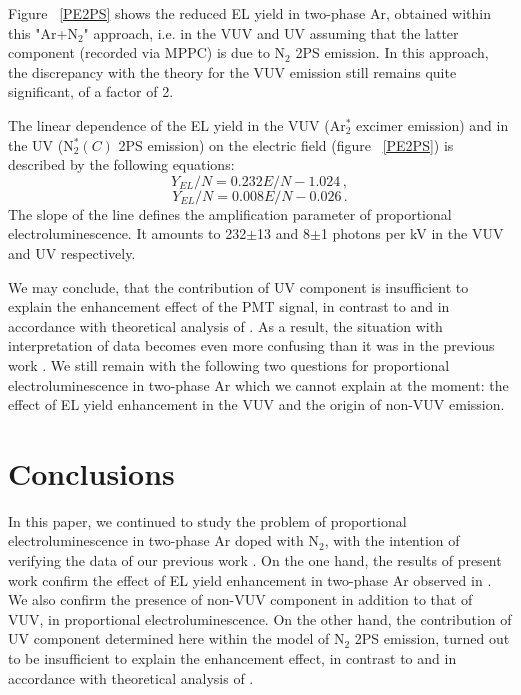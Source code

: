 \documentclass[a4paper,11pt]{article}
\begin{document}
Figure ~\ref{PE2PS} shows the reduced EL yield in two-phase Ar, obtained within this "Ar+N$_2$" approach, i.e. in the VUV and UV assuming that the latter component (recorded via MPPC) is due to N$_2$ 2PS emission. In this approach, the discrepancy with the theory for the VUV emission still remains quite significant, of a factor of 2.

The linear dependence of the EL yield in the VUV (Ar$^{\ast}_2$ excimer emission) and in the UV (N$_2^{\ast}(C)$ 2PS emission) on the electric field (figure ~\ref{PE2PS}) is described by the following equations:
\begin{equation}
Y_{EL}/N = 0.232E/N-1.024 \,,
\end{equation}
\begin{equation}
Y_{EL}/N = 0.008E/N-0.026 \,.
\end{equation}
The slope of the line defines the amplification parameter of proportional electroluminescence. It amounts to 232$\pm$13 and 8$\pm$1 photons per kV in the VUV and UV respectively.

We may conclude, that the contribution of UV component is insufficient to explain the enhancement effect of the PMT signal, in contrast to \cite{CRADPropEL15} and in accordance with theoretical analysis of \cite{ArXeN2Proc17}.
As a result, the situation with interpretation of data becomes even more confusing than it was in the previous work \cite{CRADPropEL15}. We still remain with the following two questions for proportional electroluminescence in two-phase Ar which we cannot explain at the moment: the effect of EL yield enhancement in the VUV and the origin of non-VUV emission.

\section{Conclusions}

In this paper, we continued to study the problem of proportional electroluminescence in two-phase Ar doped with N$_2$, with the intention of verifying the data of our previous work \cite{CRADPropEL15}. On the one hand, the results of present work confirm the effect of EL yield enhancement in two-phase Ar observed in \cite{CRADPropEL15}. We also confirm the presence of non-VUV component in addition to that of VUV, in proportional electroluminescence. On the other hand, the contribution of UV component determined here within the model of N$_2$ 2PS emission, turned out to be insufficient to explain the enhancement effect, in contrast to \cite{CRADPropEL15} and in accordance with theoretical analysis of \cite{ArXeN2Proc17}.
\end{document}
